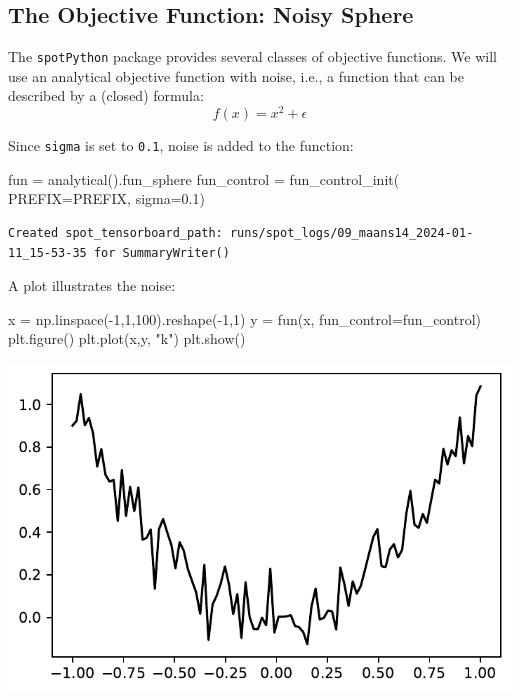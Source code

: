 \documentclass[
  letterpaper,
  DIV=11,
  numbers=noendperiod]{scrreprt}
\newenvironment{Shaded}{\begin{snugshade}}{\end{snugshade}}
\newcommand{\DecValTok}[1]{\textcolor[rgb]{0.68,0.00,0.00}{#1}}
\newcommand{\FloatTok}[1]{\textcolor[rgb]{0.68,0.00,0.00}{#1}}
\newcommand{\NormalTok}[1]{\textcolor[rgb]{0.00,0.23,0.31}{#1}}
\newcommand{\OperatorTok}[1]{\textcolor[rgb]{0.37,0.37,0.37}{#1}}
\newcommand{\StringTok}[1]{\textcolor[rgb]{0.13,0.47,0.30}{#1}}
\begin{document}
\subsection{The Objective Function: Noisy
Sphere}\label{the-objective-function-noisy-sphere-1}

The \texttt{spotPython} package provides several classes of objective
functions. We will use an analytical objective function with noise,
i.e., a function that can be described by a (closed) formula:
\[f(x) = x^2 + \epsilon\]

Since \texttt{sigma} is set to \texttt{0.1}, noise is added to the
function:

\begin{Shaded}
\begin{Highlighting}[]
\NormalTok{fun }\OperatorTok{=}\NormalTok{ analytical().fun\_sphere}
\NormalTok{fun\_control }\OperatorTok{=}\NormalTok{ fun\_control\_init(}
\NormalTok{    PREFIX}\OperatorTok{=}\NormalTok{PREFIX,}
\NormalTok{    sigma}\OperatorTok{=}\FloatTok{0.1}\NormalTok{)}
\end{Highlighting}
\end{Shaded}

\begin{verbatim}
Created spot_tensorboard_path: runs/spot_logs/09_maans14_2024-01-11_15-53-35 for SummaryWriter()
\end{verbatim}

A plot illustrates the noise:

\begin{Shaded}
\begin{Highlighting}[]
\NormalTok{x }\OperatorTok{=}\NormalTok{ np.linspace(}\OperatorTok{{-}}\DecValTok{1}\NormalTok{,}\DecValTok{1}\NormalTok{,}\DecValTok{100}\NormalTok{).reshape(}\OperatorTok{{-}}\DecValTok{1}\NormalTok{,}\DecValTok{1}\NormalTok{)}
\NormalTok{y }\OperatorTok{=}\NormalTok{ fun(x, fun\_control}\OperatorTok{=}\NormalTok{fun\_control)}
\NormalTok{plt.figure()}
\NormalTok{plt.plot(x,y, }\StringTok{"k"}\NormalTok{)}
\NormalTok{plt.show()}
\end{Highlighting}
\end{Shaded}

\includegraphics{014_num_spot_ocba_files/figure-pdf/cell-4-output-1.pdf}
\end{document}
